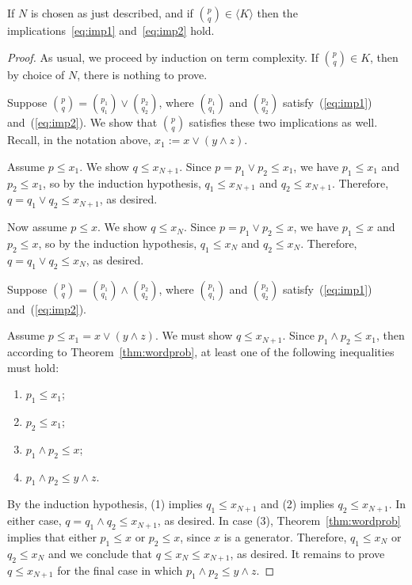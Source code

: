 \medskip

 If $N$ is chosen as just described, and if $\binom{p}{q} \in \langle K \rangle$ then the implications~\ref{eq:imp1} and~\ref{eq:imp2} hold.

\begin{proof}
  As usual, we proceed by induction on term complexity.
If $\binom{p}{q} \in K$, then by choice of $N$, there is nothing to prove.

\medskip
{} Suppose $\binom{p}{q} = \binom{p_1}{q_1} \vee \binom{p_2}{q_2}$, where $\binom{p_1}{q_1}$ and $\binom{p_2}{q_2}$ satisfy~(\ref{eq:imp1}) and~(\ref{eq:imp2}). We show that $\binom{p}{q}$ satisfies these two implications as well.
Recall, in the notation above, $x_1:=x \vee (y \wedge z)$.


Assume $p\leqslant x_1$. We show $q \leq x_{N+1}$.
Since $p = p_1 \vee p_2 \leq x_1$, we have 
$p_1 \leqslant x_1$ and 
$p_2 \leqslant x_1$, so by the induction hypothesis,  
$q_1 \leqslant x_{N+1}$ and 
$q_2 \leqslant x_{N+1}$.  Therefore, $q = q_1 \vee q_2 \leq x_{N+1}$, as desired.

Now assume $p\leqslant x$. We show $q\leqslant x_N$. 
Since $p = p_1 \vee p_2 \leq x$, we have 
$p_1 \leqslant x$ and 
$p_2 \leqslant x$, so by the induction hypothesis,  
$q_1 \leqslant x_{N}$ and 
$q_2 \leqslant x_{N}$.  Therefore, $q = q_1 \vee q_2 \leq x_{N}$, as desired.


\medskip
{} Suppose $\binom{p}{q} = \binom{p_1}{q_1} \wedge \binom{p_2}{q_2}$, where $\binom{p_1}{q_1}$ and $\binom{p_2}{q_2}$ satisfy~(\ref{eq:imp1}) and~(\ref{eq:imp2}). 

Assume $p\leqslant x_1 = x \vee (y \wedge z)$. 
We must show $q\leqslant x_{N+1}$. 
Since $p_1 \wedge p_2 \leqslant x_1$, then according to Theorem~\ref{thm:wordprob}, at least one of the following inequalities must hold:
\begin{enumerate}
  \item $p_1 \leqslant x_1$;
  \item $p_2 \leqslant x_1$;
  \item $p_1 \wedge p_2 \leqslant x$;
  \item $p_1 \wedge p_2 \leqslant y \wedge z$.
\end{enumerate}
By the induction hypothesis, (1) implies $q_1 \leq x_{N+1}$  and (2) implies $q_2 \leq x_{N+1}$.  In either case, $q = q_1 \wedge q_2 \leq x_{N+1}$, as desired.  In case (3), Theorem~\ref{thm:wordprob} implies that either $p_1 \leq x$ or $p_2 \leq x$, since $x$ is a generator. Therefore, $q_1 \leq x_N$ or $q_2 \leq x_N$ and we conclude that 
$q \leq x_N \leq x_{N+1}$, as desired.  It remains to prove $q \leq x_{N+1}$ for the final case in which $p_1 \wedge p_2 \leq y \wedge z$. 


\end{proof}
